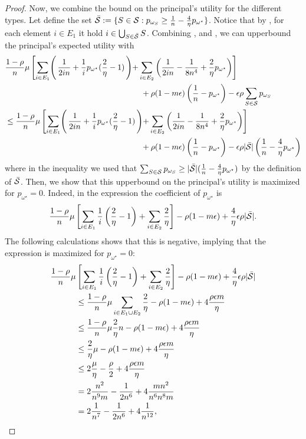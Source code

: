 \begin{proof}
        Now, we combine the bound on the principal's utility for the different types.
    Let define the set $\bar {\mathcal{S}}:=\{S\in\mathcal{S}: p_{\omega_S}\ge\frac{1}{n}-\frac{4}{\eta}p_{\omega^\star}\}$. Notice that by , for each element $i \in E_1$ it hold $i \in \bigcup_{S\in \bar {\mathcal{S}}} S$. Combining ,  and , we can upperbound the  principal's expected  utility with
    \begin{align}
    &\frac{1-\rho}{n}\mu\left[\sum_{i\in E_1}\right(\frac{1}{2in}+\frac{1}{i}p_{\omega^\star}(\frac{2}{\eta}-1)\left)+\sum_{i\in E_2}\left(\frac{1}{2in}-\frac{1}{8n^4}+\frac{2}{\eta}p_{\omega^\star}\right)\right]\nonumber\\
    &\hspace{6cm}+\rho(1-m\epsilon)\left(\frac{1}{n}-p_{\omega^\star}\right)-\epsilon\rho\sum_{S\in\Scal}p_{\omega_S}\nonumber\\
    & \le \frac{1-\rho}{n}\mu\left[\sum_{i\in E_1}\right(\frac{1}{2in}+\frac{1}{i}p_{\omega^\star}(\frac{2}{\eta}-1)\left)+\sum_{i\in E_2}\left(\frac{1}{2in}-\frac{1}{8n^4}+\frac{2}{\eta}p_{\omega^\star}\right)\right]\nonumber\\
    &\hspace{6cm}+\rho(1-m\epsilon)\left(\frac{1}{n}-p_{\omega^\star}\right)-\epsilon\rho |\bar\Scal|\left(\frac{1}{n}-\frac{4}{\eta}p_{\omega^\star}\right) \label{eq:upperbound}
    \end{align}
    where in the inequality we used that $\sum_{S\in\mathcal{S}} p_{\omega_S}\ge |\bar{\mathcal{S}}|(\frac{1}{n}-\frac{4}{\eta}p_{\omega^\star})$ by the definition of $\bar {\mathcal{S}}$.
    Then, we show that this upperbound on the principal's utility is maximized for $p_{\omega^\star}=0$. Indeed, in the expression the coefficient of $p_{\omega^\star}$ is 
	\[
	\frac{1-\rho}{n}\mu\left[\sum_{i\in E_1}\frac{1}{i}\left(\frac{2}{\eta}-1\right)+\sum_{i\in E_2}\frac{2}{\eta}\right]-\rho(1-m\epsilon)+\frac{4}{\eta}\epsilon\rho|\bar{\mathcal{S}}|.
	\]
	The following calculations shows that this is negative, implying that the expression is maximized for $p_{\omega^\star}=0$:
	\begin{align*}
		\frac{1-\rho}{n}\mu&\left[\sum_{i\in E_1}\frac{1}{i}\left(\frac{2}{\eta}-1\right)+\sum_{i\in E_2}\frac{2}{\eta}\right]-\rho(1-m\epsilon)+\frac{4}{\eta}\epsilon\rho|\bar{\mathcal{S}}|\\
		&\le \frac{1-\rho}{n}\mu\sum_{i\in E_1\cup E_2}\frac{2}{\eta} - \rho(1-m\epsilon)+4\frac{\rho \epsilon m}{\eta}\\
		&\le \frac{1-\rho}{n}\mu\frac{2}{\eta}n-\rho(1-m\epsilon)+4\frac{\rho \epsilon m}{\eta}\\
		&\le \frac{2}{\eta}\mu-\rho(1-m\epsilon)+4\frac{\rho \epsilon m}{\eta}\\
		&\le 2\frac{\mu}{\eta}-\frac{\rho}{2}+4\frac{\rho \epsilon m}{\eta}\\
		&=2\frac{n^2}{n^9m}-\frac{1}{2n^6}+4\frac{mn^2}{n^6n^8m}\\
		&=2\frac{1}{n^7}-\frac{1}{2n^6}+4\frac{1}{n^{12}},
	\end{align*}
	

\end{proof}
